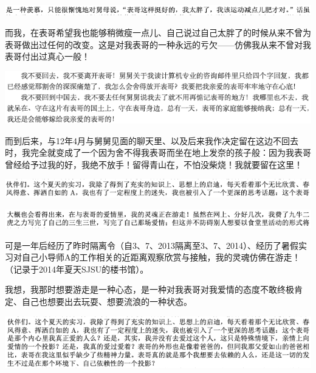 \documentclass[9pt, b5paper]{article}
\begin{document}
\begin{center}
\includegraphics[width=.9\linewidth]{./pic/backups_plans_20210426_163905.png}
\end{center}

而我，在表哥希望我也能够稍微瘦一点儿、自己说过自己太胖了的时候从来不曾为表哥做出过任何的改变。这是对我表哥的一种永远的亏欠——仿佛我从来不曾对我表哥付出过真心一般！

\begin{center}
\includegraphics[width=.9\linewidth]{./pic/backups_plans_20210426_164137.png}
\end{center}

而到后来，与12年4月与舅舅见面的聊天里、以及后来我作决定留在这边不回去时，我完全就变成了一个因为舍不得我表哥而坐在地上发奈的孩子般：因为我表哥曾经给予过我的好，我绝不放手！留得青山在，不怕没柴烧！我就要留在这里！

\begin{center}
\includegraphics[width=.9\linewidth]{./pic/backups_plans_20210426_113411.png}
\end{center}

\begin{center}
\includegraphics[width=.9\linewidth]{./pic/backups_plans_20210426_113704.png}
\end{center}

可是一年后经历了昨时隔离令（自3、7、2013隔离至3、7、2014）、经历了暑假实习对自己小导师A的工作相关的近距离观察欣赏与接触，我的灵魂仿佛在游走！（记录于2014年夏天SJSU的楼书馆）。

我想，我那时想要游走是一种心态，是一种对我表哥对我爱情的态度不敢终极肯定、自己也想要出去玩耍、想要流浪的一种状态。

\begin{center}
\includegraphics[width=.9\linewidth]{./pic/backups_plans_20210422_075555.png}
\end{center}
\end{document}
